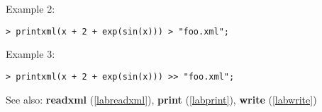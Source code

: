 \noindent Example 2: 
\begin{center}\begin{minipage}{15cm}\begin{Verbatim}[frame=single]
> printxml(x + 2 + exp(sin(x))) > "foo.xml";
\end{Verbatim}
\end{minipage}\end{center}
\noindent Example 3: 
\begin{center}\begin{minipage}{15cm}\begin{Verbatim}[frame=single]
> printxml(x + 2 + exp(sin(x))) >> "foo.xml";
\end{Verbatim}
\end{minipage}\end{center}
See also: \textbf{readxml} (\ref{labreadxml}), \textbf{print} (\ref{labprint}), \textbf{write} (\ref{labwrite})
